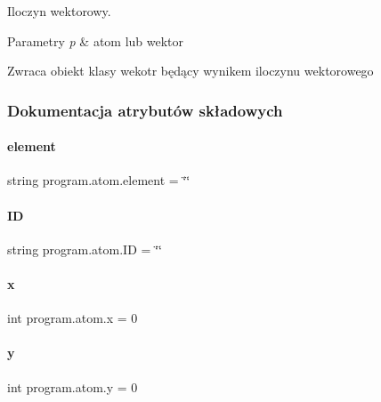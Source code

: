 Iloczyn wektorowy. 


\begin{DoxyParams}{Parametry}
{\em p} & atom lub wektor \\
\hline
\end{DoxyParams}
\begin{DoxyReturn}{Zwraca}
obiekt klasy wekotr będący wynikem iloczynu wektorowego 
\end{DoxyReturn}


\subsubsection{Dokumentacja atrybutów składowych}
\mbox{\label{classprogram_1_1atom_a5fa9a282889868d0c16746363dc0b752}} 
\paragraph{element}
{\footnotesize\ttfamily string program.\+atom.\+element = \char`\"{}\char`\"{}\hspace{0.3cm}{\ttfamily [static]}}

\mbox{\label{classprogram_1_1atom_ad5d5e12a3a0d6fbea03c4ac869a7515b}} 
\paragraph{ID}
{\footnotesize\ttfamily string program.\+atom.\+ID = \char`\"{}\char`\"{}\hspace{0.3cm}{\ttfamily [static]}}

\mbox{\label{classprogram_1_1atom_a47cec40d5c2d49c7e02077c0ebcbb585}} 
\paragraph{x}
{\footnotesize\ttfamily int program.\+atom.\+x = 0\hspace{0.3cm}{\ttfamily [static]}}

\mbox{\label{classprogram_1_1atom_aecd799b1f1cbb084dbc98af69aa2163a}} 
\paragraph{y}
{\footnotesize\ttfamily int program.\+atom.\+y = 0\hspace{0.3cm}{\ttfamily [static]}}

